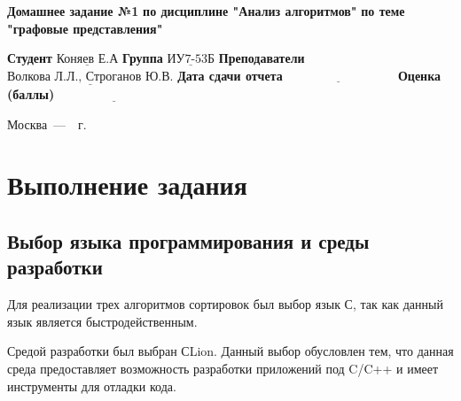 \documentclass[12pt]{report}
\begin{document}
\begin{titlepage}
		
		\begin{center}
			\noindent\begin{minipage}{1.3\textwidth}\centering
				\Large\textbf{ Домашнее задание №1}\newline
				\textbf{по дисциплине "Анализ алгоритмов"}\newline
                \textbf{по теме "графовые представления"}\newline\newline
			\end{minipage}
		\end{center}
		
		\noindent\textbf{Студент} $\underline{\text{Коняев Е.А}}$\newline\newline
		\noindent\textbf{Группа} $\underline{\text{ИУ7-53Б}}$\newline\newline
		\noindent\textbf{Преподаватели} $\underline{\text{Волкова Л.Л., Строганов Ю.В.}}$\newline\newline
		\noindent\textbf{Дата сдачи отчета}$\underline{\text{~~~~~~~~~~~~~~~~~~~~~~~~~~~}}$\newline\newline
		\noindent\textbf{Оценка (баллы)} $\underline{\text{~~~~~~~~~~~~~~~~~~~~~~~~~~~}}$\newline\newline\newline
		
		\begin{center}
			\vfill
			Москва~---~\the\year~г.
		\end{center}
	\end{titlepage}
	
	\setcounter{page}{2}
	\tableofcontents
	
	\newpage
	\chapter{Выполнение задания}

    \section{Выбор языка программирования и среды разработки}
	
	Для реализации трех алгоритмов сортировок был выбор язык С, так как данный язык является быстродейственным.

	Средой разработки был выбран СLion. Данный выбор обусловлен тем, что данная среда предоставляет возможность разработки приложений под C/C++ и имеет инструменты для отладки кода. 
\end{document}
